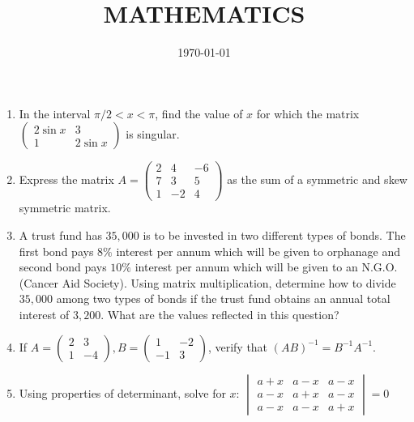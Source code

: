 \documentclass[10pt,-letter paper]{article}
\title{MATHEMATICS}
\date{\today}
\newcommand{\myvec}[1]{\ensuremath{\begin{pmatrix}#1\end{pmatrix}}}
\newcommand{\mydet}[1]{\ensuremath{\begin{vmatrix}#1\end{vmatrix}}}
\begin{document}
\maketitle

\begin{enumerate}
\section{Matrices}
\item In the interval ${\pi}/2<x<\pi$, find the value of $x$ for which the matrix $\myvec{2\sin{x} & 3 \\ 1 & 2\sin{x}}$ is singular.\\
\item Express the matrix $A = \myvec{2&4&-6\\7&3&5\\1&-2&4}$ as the sum of a symmetric and skew symmetric matrix. \\
\item A trust fund has \rupee $35,000$ is to be invested in two different types of bonds. The first bond pays $8\%$ interest per annum which will be given to orphanage and second bond pays $10\%$ interest per annum which will be given to an N.G.O. (Cancer Aid Society). Using matrix multiplication, determine how to divide \rupee $35,000$ among two types of bonds if the trust fund obtains an annual total interest of \rupee $3,200$. What are the values reflected in this question? \\
\item If $A = \myvec{2&3\\1&-4}, B = \myvec{1&-2\\-1&3}$, verify that $(AB)^{-1} = B^{-1}A^{-1}$. \\
\item Using properties of determinant, solve for $x$:
$\mydet{a+x & a-x & a-x \\ a-x & a+x & a-x \\ a-x & a-x & a+x} = 0$ \\

\end{enumerate}
\end{document}
